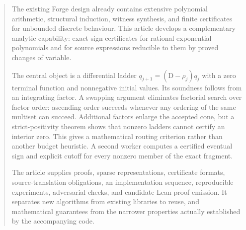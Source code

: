 \documentclass[11pt,letterpaper]{article}
\theoremstyle{definition}
\theoremstyle{remark}
\newcommand{\D}{\mathrm D}
\begin{document}
\hypersetup{pageanchor=true}
\begin{abstract}
The existing Forge design already contains extensive polynomial arithmetic,
structural induction, witness synthesis, and finite certificates for unbounded
discrete behaviour. This article develops a complementary analytic capability:
exact sign certificates for rational exponential polynomials and for source
expressions reducible to them by proved changes of variable.

The central object is a differential ladder
$q_{j+1}=(\D-\rho_j)q_j$ with a zero terminal function and nonnegative initial
values. Its soundness follows from an integrating factor. A swapping argument
eliminates factorial search over factor order: ascending order succeeds whenever
any ordering of the same multiset can succeed. Additional factors enlarge the
accepted cone, but a strict-positivity theorem shows that nonzero ladders cannot
certify an interior zero. This gives a mathematical routing criterion rather
than another budget heuristic. A second worker computes a certified eventual
sign and explicit cutoff for every nonzero member of the exact fragment.

The article supplies proofs, sparse representations, certificate formats,
source-translation obligations, an implementation sequence, reproducible
experiments, adversarial checks, and candidate Lean proof emission. It separates
new algorithms from existing libraries to reuse, and mathematical guarantees
from the narrower properties actually established by the accompanying code.
\end{abstract}
\begingroup
\small
\setlength{\parskip}{0pt}
\tableofcontents
\endgroup
\clearpage
{}









\appendix



\end{document}

